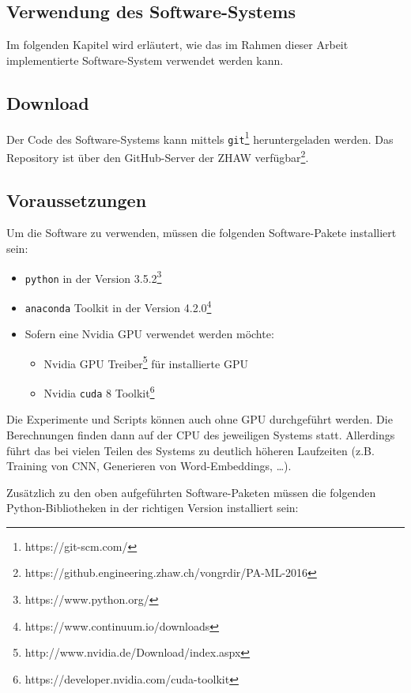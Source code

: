 \begin{appendices}
\chapter{Verwendung des Software-Systems}
Im folgenden Kapitel wird erläutert, wie das im Rahmen dieser Arbeit implementierte Software-System verwendet werden kann.

\section{Download}
Der Code des Software-Systems kann mittels \texttt{git}\footnote{https://git-scm.com/} heruntergeladen werden. Das Repository ist über den GitHub-Server der ZHAW verfügbar\footnote{https://github.engineering.zhaw.ch/vongrdir/PA-ML-2016}.

\section{Voraussetzungen}
Um die Software zu verwenden, müssen die folgenden Software-Pakete installiert sein:

\begin{itemize}[noitemsep]
  \item \texttt{python} in der Version 3.5.2\footnote{https://www.python.org/}
  \item \texttt{anaconda} Toolkit in der Version 4.2.0\footnote{https://www.continuum.io/downloads}
  \item Sofern eine Nvidia GPU verwendet werden möchte:
    \begin{itemize}[noitemsep]
      \item Nvidia GPU Treiber\footnote{http://www.nvidia.de/Download/index.aspx} für installierte GPU
      \item Nvidia \texttt{cuda} 8 Toolkit\footnote{https://developer.nvidia.com/cuda-toolkit}
    \end{itemize}
\end{itemize}

Die Experimente und Scripts können auch ohne GPU durchgeführt werden. Die Berechnungen finden dann auf der CPU des jeweiligen Systems statt. Allerdings führt das bei vielen Teilen des Systems zu deutlich höheren Laufzeiten (z.B. Training von CNN, Generieren von Word-Embeddings, \dots).

Zusätzlich zu den oben aufgeführten Software-Paketen müssen die folgenden Python-Bibliotheken in der richtigen Version installiert sein:


\end{appendices}
